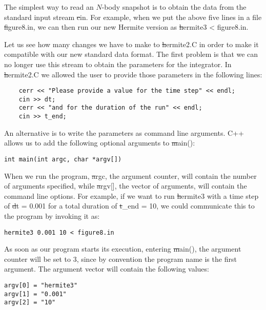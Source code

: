 The simplest way to read an $N$-body snapshot is to obtain the data
from the standard input stream {\st cin}.  For example, when we put
the above five lines in a file {\st figure8.in}, we can then run our
new Hermite version as {\st hermite3 < figure8.in}.

Let us see how many changes we have to make to {\st hermite2.C} in
order to make it compatible with our new standard data format.  The
first problem is that we can no longer use this stream to obtain the
parameters for the integrator.  In {\st hermite2.C} we allowed the
user to provide those parameters in the following lines:

\begin{small}
\begin{verbatim}
    cerr << "Please provide a value for the time step" << endl;
    cin >> dt;
    cerr << "and for the duration of the run" << endl;
    cin >> t_end;
\end{verbatim}
\end{small}

An alternative is to write the parameters as command line arguments.
C++ allows us to add the following optional arguments to {\st main():}

\begin{small}
\begin{verbatim}
int main(int argc, char *argv[])
\end{verbatim}
\end{small}

When we run the program, {\st argc}, the argument counter, will
contain the number of arguments specified, while {\st argv[]}, the
vector of arguments, will contain the command line options.  For
example, if we want to run {\st hermite3} with a time step of
{\st dt = 0.001} for a total duration of {\st t\_end = 10}, we could
communicate this to the program by invoking it as:

\begin{small}
\begin{verbatim}
hermite3 0.001 10 < figure8.in
\end{verbatim}
\end{small}

As soon as our program starts its execution, entering {\st main()},
the argument counter will be set to 3, since by convention the program
name is the first argument.  The argument vector will contain the
following values:

\begin{small}
\begin{verbatim}
argv[0] = "hermite3"
argv[1] = "0.001"
argv[2] = "10"
\end{verbatim}
\end{small}

